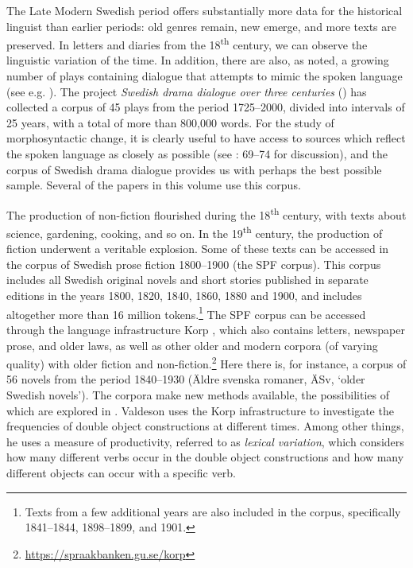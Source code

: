 \documentclass[output=paper]{langscibook}
\begin{document}
The Late Modern Swedish period offers substantially more data for the historical linguist than earlier periods: old genres remain, new emerge, and more texts are preserved. In letters and diaries from the 18\textsuperscript{th} century, we can observe the linguistic variation of the time. In addition, there are also, as noted, a growing number of plays containing dialogue that attempts to mimic the spoken language (see e.g. \citealt{Widmark1970,Widmark2000,Thelander2007}). The project \textit{Swedish drama dialogue over three centuries} (\citealt{MarttalaStromquist2001}) has collected a corpus of 45 plays from the period 1725–2000, divided into intervals of 25 years, with a total of more than 800,000 words. For the study of morphosyntactic change, it is clearly useful to have access to sources which reflect the spoken language as closely as possible (see \citealt{Magnusson2007}: 69–74 for discussion), and the corpus of Swedish drama dialogue provides us with perhaps the best possible sample. Several of the papers in this volume use this corpus.



The production of non-fiction flourished during the 18\textsuperscript{th} century, with texts about science, gardening, cooking, and so on. In the 19\textsuperscript{th} century, the production of fiction underwent a veritable explosion. Some of these texts can be accessed in the corpus of Swedish prose fiction 1800–1900 (the SPF corpus). This corpus includes all Swedish original novels and short stories published in separate editions in the years 1800, 1820, 1840, 1860, 1880 and 1900, and includes altogether more than 16 million tokens.\footnote{Texts from a few additional years are also included in the corpus, specifically 1841–1844, 1898–1899, and 1901.}  The SPF corpus can be accessed through the language infrastructure Korp \citep{BorinEtAl2012}, which also contains letters, newspaper prose, and older laws, as well as other older and modern corpora (of varying quality) with older fiction and non-fiction.\footnote{\url{https://spraakbanken.gu.se/korp}}  Here there is, for instance, a corpus of 56 novels from the period 1840–1930 (Äldre svenska romaner, ÄSv, ‘older Swedish novels’). The corpora make new methods available, the possibilities of which are explored in . Valdeson uses the Korp infrastructure to investigate the frequencies of double object constructions at different times. Among other things, he uses a measure of productivity, referred to as \textit{lexical variation}, which considers how many different verbs occur in the double object constructions and how many different objects can occur with a specific verb.
\end{document}
